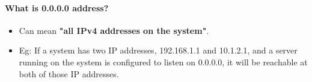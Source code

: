 \begin{flushleft}
\paragraph{What is 0.0.0.0 address?}

\begin{itemize}
	\item Can mean \textbf{"all IPv4 addresses on the system"}.
	\item Eg: If a system has two IP addresses, 192.168.1.1 and 10.1.2.1, and a server running on the system is configured to listen on 0.0.0.0, it will be reachable at both of those IP addresses.
\end{itemize}



\end{flushleft}
\newpage